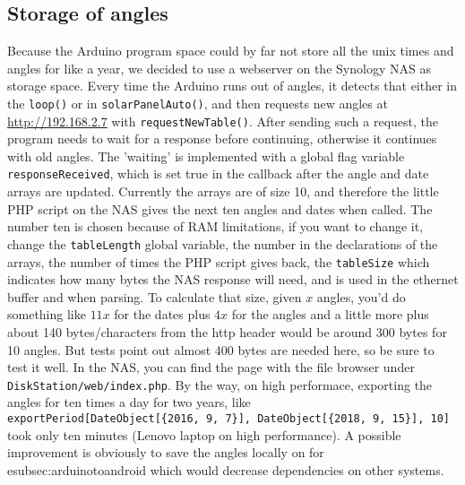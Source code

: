		\subsection{Storage of angles}\label{subsec:storageOfAngles}
			Because the Arduino program space could by far not store all the unix times and angles for like a year, we decided to use a webserver on the Synology NAS as storage space.
			Every time the Arduino runs out of angles, it detects that either in the \verb|loop()| or in \verb|solarPanelAuto()|, and then requests new angles at \url{http://192.168.2.7} with \verb|requestNewTable()|. After sending such a request, the program needs to wait for a response before continuing, otherwise it continues with old angles.
			The 'waiting' is implemented with a global flag variable \verb|responseReceived|, which is set true in the callback after the angle and date arrays are updated.
			Currently the arrays are of size 10, and therefore the little PHP script on the NAS gives the next ten angles and dates when called.
			The number ten is chosen because of RAM limitations, if you want to change it, change the \verb|tableLength| global variable, the number in the declarations of the arrays, the number of times the PHP script gives back, the \verb|tableSize| which indicates how many bytes the NAS response will need, and is used in the ethernet buffer and when parsing.
			To calculate that size, given $x$ angles, you'd do something like $11x$ for the dates plus $4x$ for the angles and a little more plus about 140 bytes/characters from the http header would be around 300 bytes for 10 angles.
			But tests point out almost 400 bytes are needed here, so be sure to test it well.
			In the NAS, you can find the page with the file browser under \verb|DiskStation/web/index.php|.
			By the way, on high performace, exporting the angles for ten times a day for two years, like \\ \verb|exportPeriod[DateObject[{2016, 9, 7}], DateObject[{2018, 9, 15}], 10]| took only ten minutes (Lenovo laptop on high performance).
			A possible improvement is obviously to save the angles locally on for e{subsec:arduinotoandroid} which would decrease dependencies on other systems.
